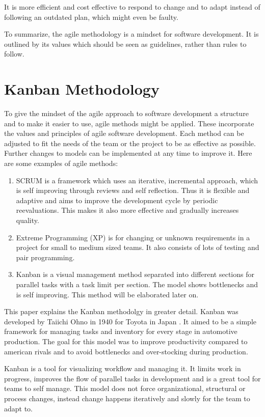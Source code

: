 \documentclass[runningheads]{llncs}
\begin{document}
It is more efficient and cost effective to respond to change and to adapt instead of following an outdated plan, which might even be faulty.

To summarize, the agile methodology is a mindset for software development. It is outlined by its values\cite{ref_agilemanifesto}
which should be seen as guidelines, rather than rules to follow.

\section{Kanban Methodology}
To give the mindset of the agile approach to software development a structure and to make it easier to use, agile methods might 
be applied. These incorporate the values and principles of agile software development. Each method can be adjusted to fit the 
needs of the team or the project to be as effective as possible. 
Further changes to models can be implemented at any time to improve it. Here are some examples of agile methods:

\begin{enumerate}
  \item SCRUM is a framework which uses an iterative, incremental approach, which is self improving through reviews and self reflection. 
  Thus it is flexible and adaptive and aims to improve the development cycle by periodic reevaluations. This makes it also more 
  effective and gradually increases quality.
  \item Extreme Programming (XP) is for changing or unknown requirements in a project for small to medium sized teams. It also consists
  of lots of testing and pair programming.
  \item Kanban is a visual management method separated into different sections for parallel tasks with a task limit per section. The model 
  shows bottlenecks and is self improving. This method will be elaborated later on.
\end{enumerate}

This paper explains the Kanban methodolgy in greater detail. Kanban was developed by Taiichi Ohno in 1940 for Toyota in Japan \cite{ref_kanban}. 
It aimed to be a simple framework for managing tasks and inventory for every stage in automotive production. The goal for this model 
was to improve productivity compared to american rivals and to avoid bottlenecks and over-stocking during production. 

Kanban is a tool for visualizing workflow and managing it. It limits work in progress, improves the flow of parallel tasks in development 
and is a great tool for teams to self manage. This model does not force organizational, structural or process changes, instead change happens 
iteratively and slowly for the team to adapt to.
\end{document}
